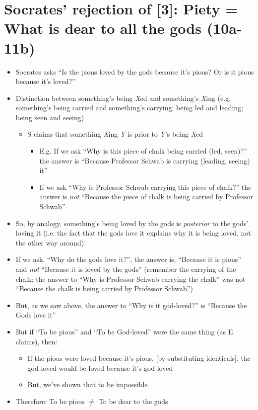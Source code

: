 \documentclass[11pt]{article}
\begin{document}
\section*{Socrates' rejection of [3]: Piety = What is dear to all the gods (10a-11b)}
\begin{itemize}
\item{Socrates asks ``Is the pious loved by the gods because it's pious? Or is it pious because it's loved?''}
\item{Distinction between something's being \emph{X}ed and something's \emph{X}ing (e.g. something's being carried and something's carrying; being led and leading; being seen and seeing)}

\begin{itemize}\item{S claims that something \emph{X}ing \emph{Y} is prior to \emph{Y}'s being \emph{X}ed}
\begin{itemize}\item{E.g. If we ask ``Why is this piece of chalk being carried (led, seen)?'' the answer is ``Because Professor Schwab is carrying (leading, seeing) it''}\item{If we ask ``Why is Professor Schwab carrying this piece of chalk?'' the answer is \emph{not} ``Because the piece of chalk is being carried by Professor Schwab''}\end{itemize}\end{itemize}
\item{So, by analogy, something's being loved by the gods is \emph{posterior} to the gods' loving it (i.e. the fact that the gods love it explains why it is being loved, not the other way around)}

\item{If we ask, ``Why do the gods love it?'', the answer is, ``Because it is pious'' and \emph{not} ``Because it is loved by the gods'' (remember the carrying of the chalk: the answer to ``Why is Professor Schwab carrying the chalk'' was not ``Because the chalk is being carried by Professor Schwab'')}

\item{But, as we saw above, the answer to ``Why is it god-loved?'' is ``Because the Gods love it''} \item{But if ``To be pious'' and ``To be God-loved'' were the same thing (as E claims), then:}\begin{itemize}\item{If the pious were loved because it's pious, [by substituting identicals], the god-loved would be loved because it's god-loved}\item{But, we've shown that to be impossible}\end{itemize}\item{Therefore: To be pious $\neq$ To be dear to the gods}

\end{itemize}
\end{document}
